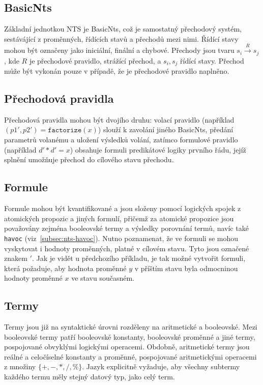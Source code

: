\documentclass{fithesis2}
\begin{document}

\subsection{BasicNts}
Základní jednotkou NTS je BasicNts, což je samostatný přechodový systém, sestávájící z proměnných, řídících stavů a přechodů mezi nimi. Řídící stavy mohou být označeny jako iniciální, finální a chybové. Přechody jsou tvaru $s_i \overset{R}{\rightarrow} s_j$, kde $R$ je přechodové pravidlo, strážící přechod, a $s_i, s_j$ řídící stavy. Přechod může být vykonán pouze v případě, že je přechodové pravidlo naplněno.

\subsection{Přechodová pravidla}
Přechodová pravidla mohou být dvojího druhu: volací pravidlo (například  $(p1',p2') = \texttt{factorize} (x)$) slouží k zavolání jiného BasicNts, předání parametrů volanému a uložení výsledků volání, zatímco formulové pravidlo (například $d' * d' = x$) obsahuje formuli predikátové logiky prvního řádu, jejíž splnění umožňuje přechod do cílového stavu přechodu. 

\subsection{Formule}
Formule mohou být kvantifikované a jsou složeny pomocí logických spojek z atomických propozic a jiných formulí, přičemž za atomické propozice jsou považovány zejména booleovské termy a výsledky porovnání termů, navíc také \texttt{havoc} (viz~\ref{subsec:nts-havoc}). Nutno poznamenat, že ve formuli se mohou vyskytovat i hodnoty proměnných, platné v cílovém stavu. Tyto jsou označené znakem $\prime$. Jak je vidět u předchozího příkladu, je tak možné vytvořit formuli, která požaduje, aby hodnota proměnné $y$ v příštím stavu byla odmocninou hodnoty proměnné $x$ ve stavu současném.

\subsection{Termy}
Termy jsou již na syntaktické úrovni rozděleny na aritmetické a booleovské. Mezi booleovské termy patří booleovské konstanty, booleovské proměnné a jiné termy, pospojované obvyklými logickými operacemi. Obdobně, aritmetické termy jsou reálné a celočíselné konstanty a proměnné, pospojované aritmetickými operacemi z množiny $\{+, -, *, /, \% \}$. Jazyk explicitně vyžaduje, aby všechny subtermy každého termu měly stejný datový typ, jako celý term.
\end{document}
